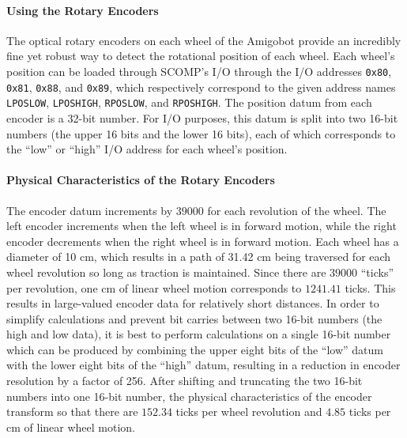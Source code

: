 \paragraph{Using the Rotary Encoders}
The optical rotary encoders on each wheel of the Amigobot provide an
incredibly fine yet robust way to detect the rotational position of
each wheel. Each wheel's position can be loaded through SCOMP's
I/O through the I/O addresses \verb+0x80+, \verb+0x81+, \verb+0x88+, and
\verb+0x89+, which respectively correspond to the given address names
\verb+LPOSLOW+, \verb+LPOSHIGH+, \verb+RPOSLOW+, and \verb+RPOSHIGH+. The position
datum from each encoder is a 32-bit number. For I/O purposes, this datum
is split into two 16-bit numbers (the upper 16 bits and the lower 16
bits), each of which corresponds to the ``low'' or ``high'' I/O
address for each wheel's position.

\paragraph{Physical Characteristics of the Rotary Encoders}
The encoder datum increments by \(39000\) for each revolution of the
wheel. The left encoder increments when the left wheel is in forward
motion, while the right encoder decrements when the right wheel is in
forward motion. Each wheel has a diameter of 10 cm, which results in a
path of 31.42 cm being traversed for each wheel revolution so long as
traction is maintained. Since there are \(39000\) ``ticks'' per
revolution, one cm of linear wheel motion corresponds to
\(1241.41\) ticks. This results in large-valued encoder data for
relatively short distances. In order to simplify calculations and
prevent bit carries between two 16-bit numbers (the high and low
data), it is best to perform calculations on a single 16-bit number
which can be produced by combining the upper eight bits of the ``low''
datum with the  lower eight bits of the ``high'' datum, resulting in a
reduction in encoder resolution by a factor of 256.  After shifting and truncating the two
16-bit numbers into one 16-bit number, the physical characteristics
of the encoder transform so that there are \(152.34\) ticks per wheel
revolution and \(4.85\) ticks per cm of linear wheel motion.

